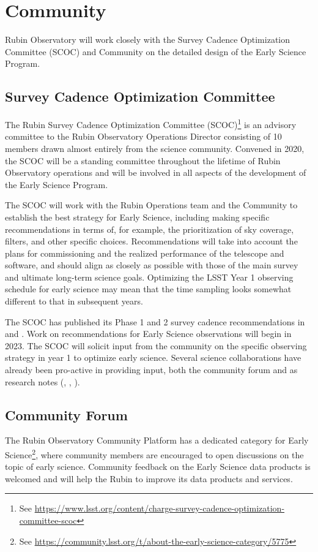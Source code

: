 \section{Community}

Rubin Observatory will work closely with the Survey Cadence Optimization Committee (SCOC) and Community on the detailed design of the Early Science Program. 

\subsection{Survey Cadence Optimization Committee}
The Rubin Survey Cadence Optimization Committee (SCOC)\footnote{See \url{https://www.lsst.org/content/charge-survey-cadence-optimization-committee-scoc}} is an advisory committee to the Rubin Observatory Operations Director consisting of 10 members drawn almost entirely from the science community.
Convened in 2020, the SCOC will be a standing committee throughout the lifetime of Rubin Observatory operations and will be involved in all aspects of the development of the Early Science Program. 

The SCOC will work with the Rubin Operations team and the Community to establish the best strategy for Early Science, including making specific recommendations in terms of, for example, the prioritization of sky coverage, filters, and other specific choices. 
Recommendations will take into account the plans for commissioning and the realized performance of the telescope and software, and should align as closely as possible with those of the main survey and ultimate long-term science goals. 
Optimizing the LSST Year 1 observing schedule for early science may mean that the time sampling looks somewhat different to that in subsequent years. 

The SCOC has published its Phase 1 and 2 survey cadence recommendations in  and . 
Work on recommendations for Early Science observations will begin in 2023.
The SCOC will solicit input from the community on the specific observing strategy in year 1 to optimize early science. 
Several science collaborations have already been pro-active in providing input,  both the community forum and as research notes (\citep{2020arXiv201005926L}, \citep{Hambleton_2020}, \citep{Street_2020}).


\subsection{Community Forum}

The Rubin Observatory Community Platform has a dedicated category for Early Science\footnote{See \url{https://community.lsst.org/t/about-the-early-science-category/5775}}, where community members are encouraged to open discussions on the topic of early science. 
Community feedback on the Early Science data products is welcomed and will help the Rubin to improve its data products and services. 
